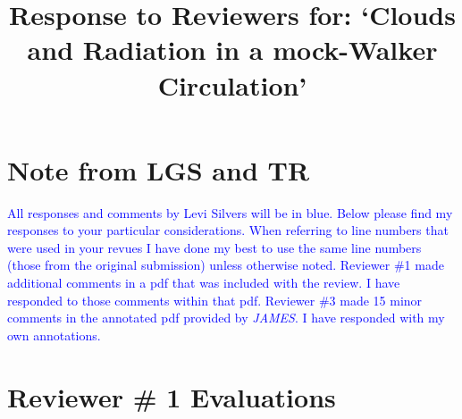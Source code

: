 \documentclass[draft]{agujournal2019}
\begin{document}
\title{Response to Reviewers for: `Clouds and Radiation in a mock-Walker Circulation'}

%
%















\section{Note from LGS and TR}

\textcolor{blue}{All responses and comments by Levi Silvers will be in blue.  Below please find my responses to your particular considerations.  When referring to line numbers that were used in your revues I have done my best to use the same line numbers (those from the original submission) unless otherwise
noted.  Reviewer \#1 made additional comments in a pdf that was included with the review.  I have responded to those comments within that pdf.  Reviewer \#3 made 15 minor comments in the annotated pdf provided by \textit{JAMES}.  I have responded with my own annotations. }

\section{Reviewer \# 1 Evaluations}
\end{document}
